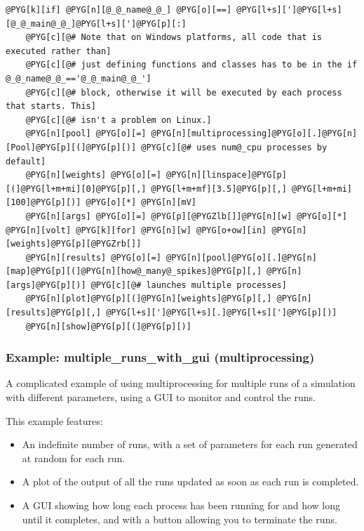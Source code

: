 \documentclass[letterpaper,10pt,english]{manual}
\begin{document}
\begin{Verbatim}[commandchars=@\[\]]
@PYG[k][if] @PYG[n][@_@_name@_@_] @PYG[o][==] @PYG[l+s][']@PYG[l+s][@_@_main@_@_]@PYG[l+s][']@PYG[p][:]
    @PYG[c][@# Note that on Windows platforms, all code that is executed rather than]
    @PYG[c][@# just defining functions and classes has to be in the if @_@_name@_@_=='@_@_main@_@_']
    @PYG[c][@# block, otherwise it will be executed by each process that starts. This]
    @PYG[c][@# isn't a problem on Linux.]
    @PYG[n][pool] @PYG[o][=] @PYG[n][multiprocessing]@PYG[o][.]@PYG[n][Pool]@PYG[p][(]@PYG[p][)] @PYG[c][@# uses num@_cpu processes by default]
    @PYG[n][weights] @PYG[o][=] @PYG[n][linspace]@PYG[p][(]@PYG[l+m+mi][0]@PYG[p][,] @PYG[l+m+mf][3.5]@PYG[p][,] @PYG[l+m+mi][100]@PYG[p][)] @PYG[o][*] @PYG[n][mV]
    @PYG[n][args] @PYG[o][=] @PYG[p][@PYGZlb[]]@PYG[n][w] @PYG[o][*] @PYG[n][volt] @PYG[k][for] @PYG[n][w] @PYG[o+ow][in] @PYG[n][weights]@PYG[p][@PYGZrb[]]
    @PYG[n][results] @PYG[o][=] @PYG[n][pool]@PYG[o][.]@PYG[n][map]@PYG[p][(]@PYG[n][how@_many@_spikes]@PYG[p][,] @PYG[n][args]@PYG[p][)] @PYG[c][@# launches multiple processes]
    @PYG[n][plot]@PYG[p][(]@PYG[n][weights]@PYG[p][,] @PYG[n][results]@PYG[p][,] @PYG[l+s][']@PYG[l+s][.]@PYG[l+s][']@PYG[p][)]
    @PYG[n][show]@PYG[p][(]@PYG[p][)]
\end{Verbatim}

\resetcurrentobjects
\hypertarget{--doc-examples-multiprocessing_multiple_runs_with_gui}{}

\hypertarget{example-multiprocessing-multiple-runs-with-gui}{}\subsubsection{Example: multiple\_runs\_with\_gui (multiprocessing)}

A complicated example of using multiprocessing for multiple runs of a simulation
with different parameters, using a GUI to monitor and control the runs.

This example features:
\begin{itemize}
\item {} 
An indefinite number of runs, with a set of parameters for each run generated
at random for each run.

\item {} 
A plot of the output of all the runs updated as soon as each run is completed.

\item {} 
A GUI showing how long each process has been running for and how long until
it completes, and with a button allowing you to terminate the runs.

\end{itemize}
\end{document}
